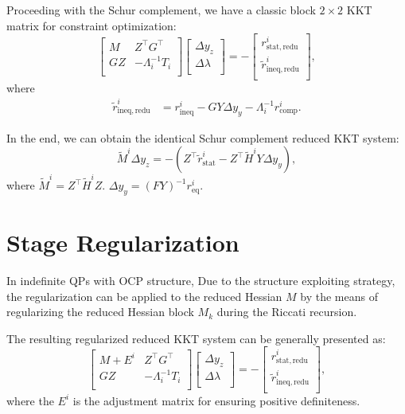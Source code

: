\documentclass[conference]{IEEEtran}
\theoremstyle{plain}
\begin{document}
Proceeding with the Schur complement, we have a classic block $2 \times 2$ KKT matrix for constraint optimization:
\begin{equation}
    \begin{bmatrix}
    M & Z^\top G^\top\\
    GZ & -\Lambda_i^{-1}T_i\\
    \end{bmatrix}
    \begin{bmatrix}
    \Delta y_z \\
    \Delta \lambda \\
    \end{bmatrix} = -
    \begin{bmatrix}
    r_{\mathrm{stat, redu}}^i \\
    \tilde{r}_{\mathrm{ineq, redu}}^i \\
    \end{bmatrix},
    \label{eq:reduced_KKT_system_schur}
\end{equation}
where
\begin{align*}
    \tilde{r}_{\mathrm{ineq, redu}}^i &=  r_{\mathrm{ineq}}^i - G Y \Delta y_y - \Lambda_i^{-1}r_{\mathrm{comp}}^i.
\end{align*}

In the end, we can obtain the identical Schur complement reduced KKT system:
\begin{equation}
    \tilde{M}^i \Delta y_z = - (Z^\top \tilde{r}_{\mathrm{stat}}^i - Z^\top \tilde{H}^i Y \Delta y_y),
\end{equation}
where $\tilde{M}^i = Z^\top \tilde{H}^i Z$. $\Delta y_y = (FY)^{-1}r_{\mathrm{eq}}^i$.

\section{Stage Regularization}
In indefinite QPs with OCP structure, Due to the structure exploiting strategy, 
the regularization can be applied to the reduced Hessian $M$ by the means of regularizing the reduced Hessian block $M_k$ during the Riccati recursion.

The resulting regularized reduced KKT system can be generally presented as:
\begin{equation}
    \begin{bmatrix}
    M + E^i & Z^\top G^\top\\
    GZ & -\Lambda_i^{-1}T_i\\
    \end{bmatrix}
    \begin{bmatrix}
    \Delta y_z \\
    \Delta \lambda \\
    \end{bmatrix} = -
    \begin{bmatrix}
    r_{\mathrm{stat, redu}}^i \\
    \tilde{r}_{\mathrm{ineq, redu}}^i \\
    \end{bmatrix},
    \label{eq:reduced_KKT_system_schur}
\end{equation}
where the $E^i$ is the adjustment matrix for ensuring positive definiteness.
\end{document}

